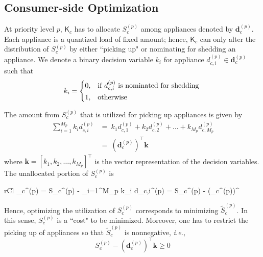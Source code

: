 \documentclass[journal, a4paper]{IEEEtran}
\begin{document}
\subsection{Consumer-side Optimization}
\label{subsec: I. Consumer-side Optimization}

At priority level $p$, $\mathsf{K}_{c}$ has to allocate $S_{c}^{\left(p\right)}$ among appliances denoted by $\mathbf{d}_{c}^{\left(p\right)}$.
Each appliance is a quantized load of fixed amount;
hence, $\mathsf{K}_{c}$ can only alter the distribution of $S_{c}^{\left(p\right)}$
by either ``picking up" or nominating for shedding an appliance.
We denote a binary decision variable $k_{i}$
for appliance $d_{c,i}^{\left(p\right)} \in \mathbf{d}_{c}^{\left(p\right)}$
such that
\begin{equation}
	\label{eqn: Consumer-side optimization variable}
	k_{i} =
	\begin{cases*}
		0, & if $d_{c,i}^{\left(p\right)}$ is nominated for shedding \\
		1, & otherwise
	\end{cases*}
\end{equation}

The amount from $S_{c}^{\left(p\right)}$ that is utilized for picking up appliances is given by
\begin{equation}
	\label{eqn: Supply utilized for appliance pick-up in a priority level}
	\begin{split}
		\sum_{i=1}^{M_{p}} k_{i} d_{c,i}^{\left(p\right)} &=\
		k_{1} d_{c,1}^{\left(p\right)} + k_{2} d_{c,2}^{\left(p\right)} + \ldots + k_{M_{p}} d_{c,M_{p}}^{\left(p\right)} \\
		&=\ \left(\mathbf{d}_{c}^{\left(p\right)}\right)^{\intercal} \mathbf{k}
	\end{split}
\end{equation}
where $\mathbf{k} = \left[ k_{1}, k_{2}, \ldots, k_{M_{p}} \right]^{\intercal}$ is the vector representation of the decision variables.
The unallocated portion of $S_{c}^{\left(p\right)}$ is
\begin{IEEEeqnarray}{rCl}
	\label{eqn: Supply not utilized for appliance pick-up in a priority level}
	\tilde{S}_{c}^{\left(p\right)} = S_{c}^{\left(p\right)} - \sum_{i=1}^{M_{p}} k_{i} d_{c,i}^{\left(p\right)} = S_{c}^{\left(p\right)} - \left(_{c}^{\left(p\right)}\right)^{\intercal} 
\end{IEEEeqnarray}
Hence, optimizing the utilization of $S_{c}^{\left(p\right)}$ corresponds to minimizing $\tilde{S}_{c}^{\left(p\right)}$.
In this sense, $S_{c}^{\left(p\right)}$ is a ``cost" to be minimized.
Moreover, one has to restrict the picking up of appliances so that $\tilde{S}_{c}^{\left(p\right)}$ is nonnegative, \textit{i.e.},
\begin{equation}
	\label{eqn: Supply not utilized for appliance pick-up in a priority level must be nonnegative}
	S_{c}^{\left(p\right)} - \left(\mathbf{d}_{c}^{\left(p\right)}\right)^{\intercal} \mathbf{k} \geq 0
\end{equation}
\end{document}
